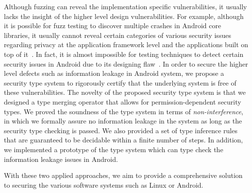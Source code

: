 Although fuzzing can reveal the implementation specific vulnerabilities, it usually lacks the insight of the higher level design vulnerabilities. For example, although it is possible for fuzz testing to discover multiple crashes in Android core libraries, it usually cannot reveal certain categories of various security issues regarding privacy at the application framework level and the applications built on top of it~\cite{Enck:2009:UAS:1512148.1512324,Ernst:2014}. In fact, it is almost impossible for testing techniques to detect certain security issues in Android due to its designing flaw~\cite{url:android-flaw}. In order to secure the higher level defects such as information leakage in Android system, we propose a security type system to rigorously certify that the underlying system is free of these vulnerabilities. The novelty of the proposed security type system is that we designed a type merging operator that allows for permission-dependent security types. We proved the soundness of the type system in terms of \emph{non-interference}, in which we formally assure no information leakage in the system as long as the security type checking is passed. We also provided a set of type inference rules that are guaranteed to be decidable within a finite number of steps. In addition, we implemented a prototype of the type system which can type check the information leakage issues in Android.

With these two applied approaches, we aim to provide a comprehensive solution to securing the various software systems such as Linux or Android.

